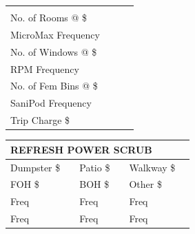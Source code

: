 \documentclass[10pt]{article}
\newcommand{\sblank}{\underline{\hspace{0.6cm}}}
\begin{document}
\begin{tabularx}{0.98\textwidth}{@{}X X X X@{}}
\begin{minipage}[t]{0.96\linewidth}
  \textbf{\textcolor{emred}{MICROMAX FLOOR}}\\[0.35em]
  No. of Rooms @ \sblank{} \$\sblank{}\\
  MicroMax Frequency\hrulefill
\end{minipage}
&
\begin{minipage}[t]{0.96\linewidth}
  \textbf{\textcolor{emred}{RPM WINDOW}}\\[0.35em]
  No. of Windows @ \sblank{} \$\sblank{}\\
  RPM Frequency\hrulefill
\end{minipage}
&
\begin{minipage}[t]{0.96\linewidth}
  \textbf{\textcolor{emred}{SANIPOD}}\\[0.35em]
  No. of Fem Bins @ \sblank{} \$\sblank{}\\
  SaniPod Frequency\hrulefill
\end{minipage}
&
\begin{minipage}[t]{0.96\linewidth}
  \textbf{\textcolor{emred}{TRIP CHARGE}}\\[0.35em]
  Trip Charge \$\hrulefill
\end{minipage}
\\
\end{tabularx}


\vspace{1.0em}

\noindent
\begin{tabularx}{0.98\textwidth}{|lX|lX|lX|}
  \hline
  \multicolumn{6}{|l|}{\textbf{\textcolor{emred}{REFRESH POWER SCRUB}}}\\ \hline
  Dumpster \$ & \hrulefill &
  Patio \$ & \hrulefill &
  Walkway \$ & \hrulefill \\[0.15em]
  FOH \$ & \hrulefill &
  BOH \$ & \hrulefill &
  Other \$ & \hrulefill \\[0.15em]
  Freq & \hrulefill &
  Freq & \hrulefill &
  Freq & \hrulefill \\[0.15em]
  Freq & \hrulefill &
  Freq & \hrulefill &
  Freq & \hrulefill \\
  \hline
\end{tabularx}
\end{document}
